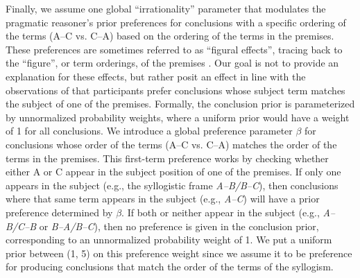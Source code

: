 \documentclass[floatsintext, doc]{apa6}
\begin{document}
Finally, we assume one global ``irrationality'' parameter that modulates the pragmatic reasoner's prior preferences for conclusions with a specific ordering of the terms (A--C vs. C--A) based on the ordering of the terms in the premises. 
These preferences are sometimes referred to as ``figural effects'', tracing back to the ``figure'', or term orderings, of the premises \cite{Wetherick1990, rips1994}.
Our goal is not to provide an explanation for these effects, but rather posit an effect in line with the observations of  that participants prefer conclusions whose subject term matches the subject of one of the premises.
Formally, the conclusion prior is parameterized by unnormalized probability weights, where a uniform prior would have a weight of 1 for all conclusions. 
We introduce a global preference  parameter $\beta$ for conclusions whose order of the terms (A--C vs. C--A) matches the order of the terms in the premises.
This first-term preference works by checking whether either A or C appear in the subject position of one of the premises.
If only one appears in the subject (e.g., the syllogistic frame \emph{A--B/B--C}), then conclusions where that same term appears in the subject (e.g., \emph{A--C}) will have a prior preference determined by $\beta$.
If both or neither appear in the subject (e.g., \emph{A--B/C--B} or \emph{B--A/B--C}), then no preference is given in the conclusion prior, corresponding to an unnormalized probability weight of 1. 
We put a uniform prior between (1, 5) on this preference weight since we assume it to be preference for producing conclusions that match the order of the terms of the syllogism. 





\end{document}
